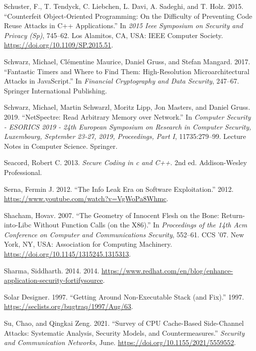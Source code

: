 \documentclass[a4paper,]{report}
\begin{document}
\leavevmode\hypertarget{ref-Schuster2015}{}%
Schuster, F., T. Tendyck, C. Liebchen, L. Davi, A. Sadeghi, and T. Holz.
2015. ``Counterfeit Object-Oriented Programming: On the Difficulty of
Preventing Code Reuse Attacks in C++ Applications.'' In \emph{2015 Ieee
Symposium on Security and Privacy (Sp)}, 745--62. Los Alamitos, CA, USA:
IEEE Computer Society. \url{https://doi.org/10.1109/SP.2015.51}.

\leavevmode\hypertarget{ref-Schwarz2017}{}%
Schwarz, Michael, Clémentine Maurice, Daniel Gruss, and Stefan Mangard.
2017. ``Fantastic Timers and Where to Find Them: High-Resolution
Microarchitectural Attacks in JavaScript.'' In \emph{Financial
Cryptography and Data Security}, 247--67. Springer International
Publishing.

\leavevmode\hypertarget{ref-Schwarz2019}{}%
Schwarz, Michael, Martin Schwarzl, Moritz Lipp, Jon Masters, and Daniel
Gruss. 2019. ``NetSpectre: Read Arbitrary Memory over Network.'' In
\emph{Computer Security - ESORICS 2019 - 24th European Symposium on
Research in Computer Security, Luxembourg, September 23-27, 2019,
Proceedings, Part I}, 11735:279--99. Lecture Notes in Computer Science.
Springer.

\leavevmode\hypertarget{ref-Seacord2013}{}%
Seacord, Robert C. 2013. \emph{Secure Coding in c and C++}. 2nd ed.
Addison-Wesley Professional.

\leavevmode\hypertarget{ref-Serna2012}{}%
Serna, Fermin J. 2012. ``The Info Leak Era on Software Exploitation.''
2012. \url{https://www.youtube.com/watch?v=VgWoPa8Whmc}.

\leavevmode\hypertarget{ref-Shacham2007}{}%
Shacham, Hovav. 2007. ``The Geometry of Innocent Flesh on the Bone:
Return-into-Libc Without Function Calls (on the X86).'' In
\emph{Proceedings of the 14th Acm Conference on Computer and
Communications Security}, 552--61. CCS '07. New York, NY, USA:
Association for Computing Machinery.
\url{https://doi.org/10.1145/1315245.1315313}.

\leavevmode\hypertarget{ref-Sharma2014}{}%
Sharma, Siddharth. 2014. 2014.
\url{https://www.redhat.com/en/blog/enhance-application-security-fortifysource}.

\leavevmode\hypertarget{ref-Solar1997}{}%
Solar Designer. 1997. ``Getting Around Non-Executable Stack (and Fix).''
1997. \url{https://seclists.org/bugtraq/1997/Aug/63}.

\leavevmode\hypertarget{ref-Su2021}{}%
Su, Chao, and Qingkai Zeng. 2021. ``Survey of CPU Cache-Based
Side-Channel Attacks: Systematic Analysis, Security Models, and
Countermeasures.'' \emph{Security and Communication Networks}, June.
\url{https://doi.org/10.1155/2021/5559552}.
\end{document}
